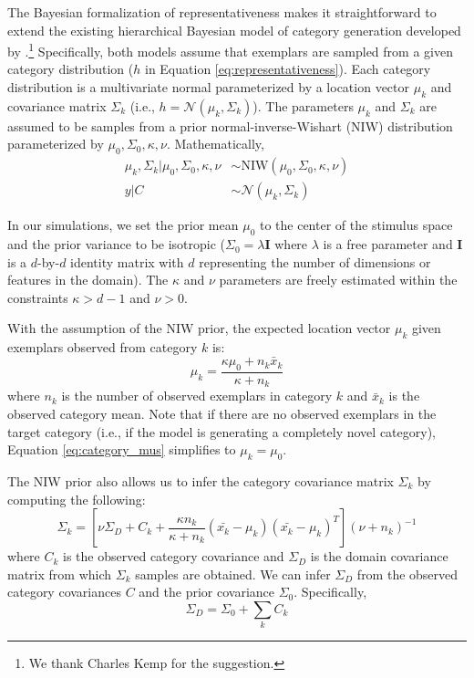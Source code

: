 \documentclass[12pt]{article}
\begin{document}
\begin{flushleft}
The Bayesian formalization of representativeness makes it straightforward to
extend the existing hierarchical Bayesian model of category generation
developed by \cite{jern2013probabilistic}.\footnote{We thank Charles Kemp for the suggestion.} Specifically, both models assume that
exemplars are sampled from a given category distribution ($h$ in
Equation \ref{eq:representativeness}). Each category distribution is a
multivariate normal parameterized by a location vector $\mu_k$ and covariance
matrix $\Sigma_k$ (i.e., $h = \mathcal{N}(\mu_k,\Sigma_k)$). The parameters
$\mu_k$ and $\Sigma_k$ are assumed to be samples from a prior
normal-inverse-Wishart (NIW) distribution parameterized by
$\mu_0,\Sigma_0,\kappa,\nu$. Mathematically,
\begin{align}
  \mu_k, \Sigma_k|\mu_0,\Sigma_0,\kappa,\nu &\sim
                                              \textrm{NIW}(\mu_0,\Sigma_0,\kappa,\nu)
                                              \label{eq:mvnsample}\\
  y|C &\sim \mathcal{N}(\mu_k,\Sigma_k) \label{eq:exemplarsample}
\end{align}

In our simulations, we set the prior mean $\mu_0$ to the center of the stimulus
space and the prior variance to be isotropic ($\Sigma_0 = \lambda \mathbf{I}$ where
$\lambda$ is a free parameter and $\mathbf{I}$ is a $d$-by-$d$ identity matrix
with $d$ representing the number of dimensions or features in the domain). The
$\kappa$ and $\nu$ parameters are freely estimated within the constraints
$\kappa > d-1$ and $\nu > 0$.

With the assumption of the NIW prior, the expected location vector $\mu_k$ given exemplars observed from category $k$ is:
\begin{equation}
  \mu_k = \dfrac
    {\kappa\mu_{0} + n_k \bar{x}_k}
    {\kappa + n_k}
    \label{eq:category_mus}
\end{equation}
where $n_k$ is the number of observed exemplars in category $k$ and $\bar{x}_k$
is the observed category mean. Note that if there are no observed exemplars in
the target category (i.e., if the model is generating a completely novel
category), Equation \ref{eq:category_mus} simplifies to $\mu_k = \mu_0$.

The NIW prior also allows us to infer the category covariance matrix $\Sigma_k$
by computing the following:
\begin{equation}
  \Sigma_k = [\nu \Sigma_D+ C_k +
    \dfrac
    {\kappa n_k}
    {\kappa + n_k}
    (\bar{x_k}-\mu_k)(\bar{x_k}-\mu_k)^T
  ] (\nu + n_k)^{-1}
  \label{eq:Sigma_y}
\end{equation}
where $C_k$ is the observed category covariance and $\Sigma_D$ is the domain
covariance matrix from which $\Sigma_k$ samples are obtained. We can
infer $\Sigma_D$ from the observed category covariances $C$ and the prior
covariance $\Sigma_0$. Specifically,
\begin{equation}
    \Sigma_D = \Sigma_0 + \sum_{k}{C_k}
\end{equation}


\end{flushleft}
\end{document}
